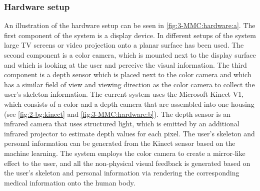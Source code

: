 \subsubsection{Hardware setup}
An illustration of the hardware setup can be seen in \figurename{\ref{fig:3-MMC:hardware:a}}. The first component of the system is a display device. In different setups of the system large TV screens or video projection onto a planar surface has been used. The second component is a color camera, which is mounted next to the display surface and which is looking at the user and perceive the visual information. The third component is a depth sensor which is placed next to the color camera and which has a similar field of view and viewing direction as the color camera to collect the user's skeleton information. 
The current system uses the Microsoft Kinect V1, which consists of a color and a depth camera that are assembled into one housing (see \figurename{\ref{fig:2-bg:kinect}} and \figurename{\ref{fig:3-MMC:hardware:b}}). The depth sensor is an infrared camera that uses structured light, which is emitted by an additional infrared projector to estimate depth values for each pixel. The user's skeleton and personal information can be generated from the Kinect sensor based on the machine learning.
The system employs the color camera to create a mirror-like effect to the user, and all the non-physical visual feedback is generated based on the user's skeleton and personal information via rendering the corresponding medical information onto the human body.

